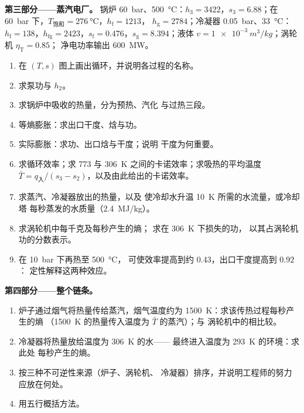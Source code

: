 \begin{problem}
\textbf{第三部分——蒸汽电厂。}
锅炉 \qty{60}{bar}、\qty{500}{\celsius}：$h_3 = 3422$，$s_3 = 6.88$；在
\qty{60}{bar} 下，$T_{\text{饱和}} = \qty{276}{\celsius}$，$h_{\text{f}} = 1213$，
$h_{\text{g}} = 2784$；冷凝器 \qty{0.05}{bar}、\qty{33}{\celsius}：
$h_{\text{f}} = 138$，$h_{\text{fg}} = 2423$，$s_{\text{f}} = 0.476$，$s_{\text{g}} =
8.394$；液体 $v = \qty{1e-3}{m^3/kg}$；涡轮机 $\eta_{\text{T}} = 0.85$；
净电功率输出 \qty{600}{MW}。
\begin{enumerate}[resume]
  \item 在 $(T,s)$ 图上画出循环，并说明各过程的名称。
  \item 求泵功与 $h_2$。
  \item 求锅炉中吸收的热量，分为预热、汽化
        与过热三段。
  \item 等熵膨胀：求出口干度、焓与功。
  \item 实际膨胀：求功、出口焓与干度；说明
        干度为何重要。
  \item 求循环效率；求 \qty{773}{} 与 \qty{306}{K}
        之间的卡诺效率；求吸热的平均温度 $\bar T = q_{\text{入}}/(s_3
        - s_2)$，以及由此给出的卡诺效率。
  \item 求蒸汽、冷凝器放出的热量，以及
        使冷却水升温 \qty{10}{K} 所需的水流量，或冷却塔
        每秒蒸发的水质量（\qty{2.4}{MJ/kg}）。
  \item 求涡轮机中每千克及每秒产生的熵；
        求在 \qty{306}{K} 下损失的功，
        以其占涡轮机功的分数表示。
  \item 在 \qty{10}{bar} 下再热至 \qty{500}{\celsius}，
        可使效率提高到约 $0.43$，出口干度提高到 $0.92$：
        定性解释这两种效应。
\end{enumerate}

\textbf{第四部分——整个链条。}
\begin{enumerate}[resume]
  \item 炉子通过烟气将热量传给蒸汽，烟气温度约为
        \qty{1500}{K}：求该传热过程每秒产生的熵
        （\qty{1500}{K} 的热量传入温度为 $\bar T$ 的蒸汽）；与
        涡轮机中的相比较。
  \item 冷凝器将热量放给温度为 \qty{306}{K} 的水——
        最终进入温度为 \qty{293}{K} 的环境：求此处
        每秒产生的熵。
  \item 按三种不可逆性来源（炉子、涡轮机、
        冷凝器）排序，并说明工程师的努力应放在何处。
  \item 用五行概括方法。
\end{enumerate}
\end{problem}
